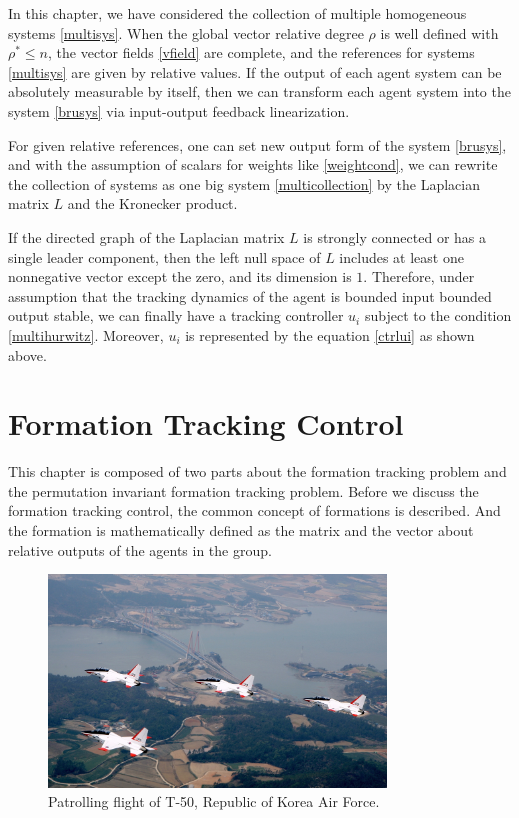 \documentclass[11pt, a4paper, oneside, openany, reqno]{book}
\theoremstyle{definition}
\theoremstyle{remark}
\numberwithin{equation}{chapter} %
\begin{document}
In this chapter, we have considered the collection of multiple homogeneous systems \eqref{multisys}.	
When the global vector relative degree $ \rho $ is well defined 
with $ \rho^* \leq n $, the vector fields \eqref{vfield} are complete, 
and the references for systems \eqref{multisys} are given by relative values.
If the output of each agent system can be absolutely measurable by itself, then
we can transform each agent system into the system \eqref{brusys} 
via input-output feedback linearization.

For given relative references, one can set new output form of the system \eqref{brusys},
and with the assumption of scalars for weights like \eqref{weightcond}, 
we can rewrite the collection of systems as one big system \eqref{multicollection} 
by the Laplacian matrix $ L $ and the Kronecker product.

If the directed graph of the Laplacian matrix $ L $ is strongly connected or
has a single leader component, then the left null space of $ L $ includes at least 
one nonnegative vector except the zero, and its dimension is $ 1 $. Therefore, 
under assumption that the tracking dynamics of the agent is bounded input bounded output stable,
we can finally have a tracking controller $ u_i $ subject to the condition \eqref{multihurwitz}.
Moreover, $ u_i $ is represented by the equation \eqref{ctrlui} as shown above.


\chapter{Formation Tracking Control}


This chapter is composed of two parts about the formation tracking problem and
the permutation invariant formation tracking problem.
Before we discuss the formation tracking control, the common concept of formations is described. 
And the formation is mathematically defined as the matrix and the vector 
about relative outputs of the agents in the group.

\begin{figure}[htp]
	\centering
	\includegraphics[width=0.80\textwidth]{t50flight2.jpg}
	\caption{Patrolling flight of T-50, Republic of Korea Air Force.}
\end{figure}
\end{document}
